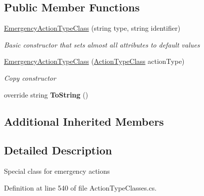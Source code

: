 \subsection*{Public Member Functions}
\begin{DoxyCompactItemize}
\item 
\hyperlink{class_general_health_care_elements_1_1_general_classes_1_1_action_types_and_paths_1_1_emergency_action_type_class_a5e43189d4be3459d8c845b8ed4743824}{Emergency\+Action\+Type\+Class} (string type, string identifier)
\begin{DoxyCompactList}\small\item\em Basic constructor that sets almost all attributes to default values \end{DoxyCompactList}\item 
\hyperlink{class_general_health_care_elements_1_1_general_classes_1_1_action_types_and_paths_1_1_emergency_action_type_class_abcf5ff5f6816d917550055aa78eece20}{Emergency\+Action\+Type\+Class} (\hyperlink{class_general_health_care_elements_1_1_general_classes_1_1_action_types_and_paths_1_1_action_type_class}{Action\+Type\+Class} action\+Type)
\begin{DoxyCompactList}\small\item\em Copy constructor \end{DoxyCompactList}\item 
override string {\bfseries To\+String} ()\hypertarget{class_general_health_care_elements_1_1_general_classes_1_1_action_types_and_paths_1_1_emergency_action_type_class_a47655380991515fb2cc0ad0611b85bd4}{}\label{class_general_health_care_elements_1_1_general_classes_1_1_action_types_and_paths_1_1_emergency_action_type_class_a47655380991515fb2cc0ad0611b85bd4}

\end{DoxyCompactItemize}
\subsection*{Additional Inherited Members}


\subsection{Detailed Description}
Special class for emergency actions 



Definition at line 540 of file Action\+Type\+Classes.\+cs.



